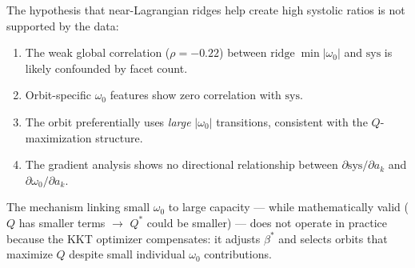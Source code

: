 The hypothesis that near-Lagrangian ridges help create high systolic
ratios is not supported by the data:
\begin{enumerate}
\item The weak global correlation ($\rho = -0.22$) between
  $\mathrm{ridge}\;\min|\omega_0|$ and $\mathrm{sys}$ is likely
  confounded by facet count.
\item Orbit-specific $\omega_0$ features show zero correlation with
  $\mathrm{sys}$.
\item The orbit preferentially uses \emph{large} $|\omega_0|$
  transitions, consistent with the $Q$-maximization structure.
\item The gradient analysis shows no directional relationship between
  $\partial\mathrm{sys}/\partial a_k$ and
  $\partial\omega_0/\partial a_k$.
\end{enumerate}

The mechanism linking small $\omega_0$ to large capacity --- while
mathematically valid ($Q$ has smaller terms $\to$ $Q^*$ could be
smaller) --- does not operate in practice because the KKT optimizer
compensates: it adjusts $\beta^*$ and selects orbits that maximize $Q$
despite small individual $\omega_0$ contributions.
